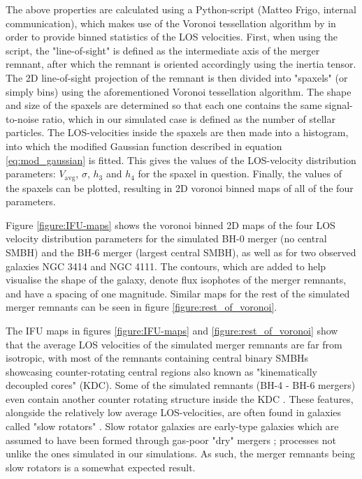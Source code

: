 \documentclass[english, oneside]{HYgradu}
\begin{document}
The above properties are calculated using a Python-script (Matteo Frigo, internal communication), which makes use of the Voronoi tessellation algorithm by \citep{Cappellari2003} in order to provide binned statistics of the LOS velocities. First, when using the script, the "line-of-sight" is defined as the intermediate axis of the merger remnant, after which the remnant is oriented accordingly using the inertia tensor. The 2D line-of-sight projection of the remnant is then divided into "spaxels" (or simply bins) using the aforementioned Voronoi tessellation algorithm. The shape and size of the spaxels are determined so that each one contains the same signal-to-noise ratio, which in our simulated case is defined as the number of stellar particles. The LOS-velocities inside the spaxels are then made into a histogram, into which the modified Gaussian function described in equation \ref{eq:mod_gaussian} is fitted. This gives the values of the LOS-velocity distribution parameters: $V_\mathrm{avg}$, $\sigma$, $h_3$ and $h_4$ for the spaxel in question. Finally, the values of the spaxels can be plotted, resulting in 2D voronoi binned maps of all of the four parameters.

Figure \ref{figure:IFU-maps} shows the voronoi binned 2D maps of the four LOS velocity distribution parameters for the simulated BH-0 merger (no central SMBH) and the BH-6 merger (largest central SMBH), as well as for two observed galaxies NGC 3414 and NGC 4111. The contours, which are added to help visualise the shape of the galaxy, denote flux isophotes of the merger remnants, and have a spacing of one magnitude. Similar maps for the rest of the simulated merger remnants can be seen in figure \ref{figure:rest_of_voronoi}.

The IFU maps in figures \ref{figure:IFU-maps} and \ref{figure:rest_of_voronoi} show that the average LOS velocities of the simulated merger remnants are far from isotropic, with most of the remnants containing central binary SMBHs showcasing counter-rotating central regions also known as "kinematically decoupled cores" (KDC). Some of the simulated remnants (BH-4 - BH-6 mergers) even contain another counter rotating structure inside the KDC \citep{Rantala2019}. These features, alongside the relatively low average LOS-velocities, are often found in galaxies called "slow rotators" \citep{Emsellem2007}. Slow rotator galaxies are early-type galaxies which are assumed to have been formed through gas-poor "dry" mergers \citep{Emsellem2007, Cappellari2007}; processes not unlike the ones simulated in our simulations. As such, the merger remnants being slow rotators is a somewhat expected result.
\end{document}
